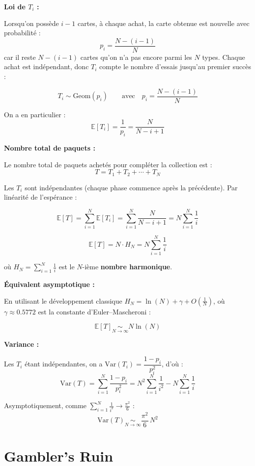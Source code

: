 \bigskip

\textbf{Loi de $T_i$ :}

Lorsqu'on possède $i-1$ cartes, à chaque achat, la carte obtenue est nouvelle avec probabilité :
\[
p_i = \frac{N - (i-1)}{N}
\]
car il reste $N - (i-1)$ cartes qu'on n'a pas encore parmi les $N$ types. Chaque achat est indépendant, donc $T_i$ compte le nombre d'essais jusqu'au premier succès :

\[
\boxed{T_i \sim \mathrm{Geom}(p_i)} \qquad \text{avec} \quad p_i = \frac{N - (i-1)}{N}
\]

On a en particulier :
\[
\mathbb{E}[T_i] = \frac{1}{p_i} = \frac{N}{N - i + 1}
\]

\bigskip

\textbf{Nombre total de paquets :}

Le nombre total de paquets achetés pour compléter la collection est :
\[
T = T_1 + T_2 + \cdots + T_N
\]

Les $T_i$ sont indépendantes (chaque phase commence après la précédente). Par linéarité de l'espérance :

\[
\mathbb{E}[T] = \sum_{i=1}^{N} \mathbb{E}[T_i] = \sum_{i=1}^{N} \frac{N}{N - i + 1} = N \sum_{i=1}^{N} \frac{1}{i}
\]

\[
\boxed{\mathbb{E}[T] = N \cdot H_N = N \sum_{i=1}^{N} \frac{1}{i}}
\]

où $H_N = \displaystyle\sum_{i=1}^{N} \frac{1}{i}$ est le $N$-ième \textbf{nombre harmonique}.

\bigskip

\textbf{Équivalent asymptotique :}

En utilisant le développement classique $H_N = \ln(N) + \gamma + O\!\left(\frac{1}{N}\right)$, où $\gamma \approx 0.5772$ est la constante d'Euler--Mascheroni :

\[
\boxed{\mathbb{E}[T] \underset{N \to \infty}{\sim} N \ln(N)}
\]



\bigskip

\textbf{Variance :}

Les $T_i$ étant indépendantes, on a $\mathrm{Var}(T_i) = \dfrac{1-p_i}{p_i^2}$, d'où :
\[
\mathrm{Var}(T) = \sum_{i=1}^{N} \frac{1 - p_i}{p_i^2} = N^2 \sum_{i=1}^{N} \frac{1}{i^2} - N\sum_{i=1}^{N}\frac{1}{i}
\]

Asymptotiquement, comme $\displaystyle\sum_{i=1}^{N} \frac{1}{i^2} \to \frac{\pi^2}{6}$ :
\[
\mathrm{Var}(T) \underset{N \to \infty}{\sim} \frac{\pi^2}{6}\,N^2
\]


\section{Gambler's Ruin}

